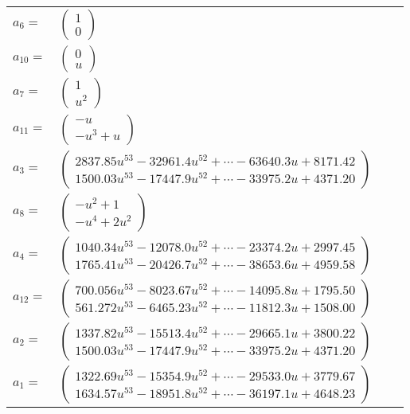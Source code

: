 \documentclass[1p]{elsarticle_modified}
\theoremstyle{definition}
\begin{document}
\begin{tabular}{m{7pt} m{180pt} m{7pt} m{180pt} }
\flushright $a_{6}=$&$\begin{pmatrix}1\\0\end{pmatrix}$ \\
\flushright $a_{10}=$&$\begin{pmatrix}0\\u\end{pmatrix}$ \\
\flushright $a_{7}=$&$\begin{pmatrix}1\\u^2\end{pmatrix}$ \\
\flushright $a_{11}=$&$\begin{pmatrix}- u\\- u^3+u\end{pmatrix}$ \\
\flushright $a_{3}=$&$\begin{pmatrix}2837.85 u^{53}-32961.4 u^{52}+\cdots-63640.3 u+8171.42\\1500.03 u^{53}-17447.9 u^{52}+\cdots-33975.2 u+4371.20\end{pmatrix}$ \\
\flushright $a_{8}=$&$\begin{pmatrix}- u^2+1\\- u^4+2 u^2\end{pmatrix}$ \\
\flushright $a_{4}=$&$\begin{pmatrix}1040.34 u^{53}-12078.0 u^{52}+\cdots-23374.2 u+2997.45\\1765.41 u^{53}-20426.7 u^{52}+\cdots-38653.6 u+4959.58\end{pmatrix}$ \\
\flushright $a_{12}=$&$\begin{pmatrix}700.056 u^{53}-8023.67 u^{52}+\cdots-14095.8 u+1795.50\\561.272 u^{53}-6465.23 u^{52}+\cdots-11812.3 u+1508.00\end{pmatrix}$ \\
\flushright $a_{2}=$&$\begin{pmatrix}1337.82 u^{53}-15513.4 u^{52}+\cdots-29665.1 u+3800.22\\1500.03 u^{53}-17447.9 u^{52}+\cdots-33975.2 u+4371.20\end{pmatrix}$ \\
\flushright $a_{1}=$&$\begin{pmatrix}1322.69 u^{53}-15354.9 u^{52}+\cdots-29533.0 u+3779.67\\1634.57 u^{53}-18951.8 u^{52}+\cdots-36197.1 u+4648.23\end{pmatrix}$ \\

\end{tabular}
\end{document}
